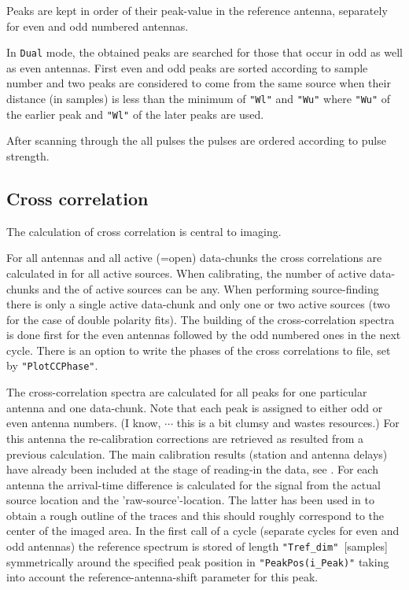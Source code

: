 Peaks are kept in order of their peak-value in the reference antenna, separately for even and odd numbered antennas.

In \verb!Dual! mode, the obtained peaks are searched for those that occur in odd as well as even antennas. First even and odd peaks are sorted according to sample number and two peaks are considered to come from the same source when their distance (in samples) is less than the minimum of \verb!"Wl"! and \verb!"Wu"! where \verb!"Wu"! of the earlier peak and \verb!"Wl"! of the later peaks are used.

After scanning through the all pulses the pulses are ordered according to pulse strength.


\subsection{Cross correlation}

The calculation of cross correlation is central to imaging.

For all antennas and all active (=open) data-chunks the cross correlations are calculated in  for all active sources. When calibrating, the number of active data-chunks and the of active sources can be any. When performing source-finding there is only a single active data-chunk and only one or two active sources (two for the case of double polarity fits). The building of the cross-correlation spectra is done first for the even antennas followed by the odd numbered ones in the next cycle. There is an option to write the phases of the cross correlations to file, set by \verb!"PlotCCPhase"!.

The cross-correlation spectra are calculated for all peaks for one particular antenna and one data-chunk. Note that each peak is assigned to either odd or even antenna numbers. (I know, $\cdots$ this is a bit clumsy and wastes resources.) For this antenna the re-calibration corrections are retrieved as resulted from a previous calculation. The main calibration results (station and antenna delays) have already been included at the stage of reading-in the data, see . For each antenna the arrival-time difference is calculated for the signal from the actual source location and the 'raw-source'-location. The latter has been used in  to  obtain a rough outline of the traces and this should roughly correspond to the center of the imaged area. In the first call of a cycle (separate cycles for even and odd antennas) the reference spectrum is stored of length \verb!"Tref_dim"!~[samples] symmetrically around the specified peak position in \verb!"PeakPos(i_Peak)"! taking into account the reference-antenna-shift parameter for this peak.

